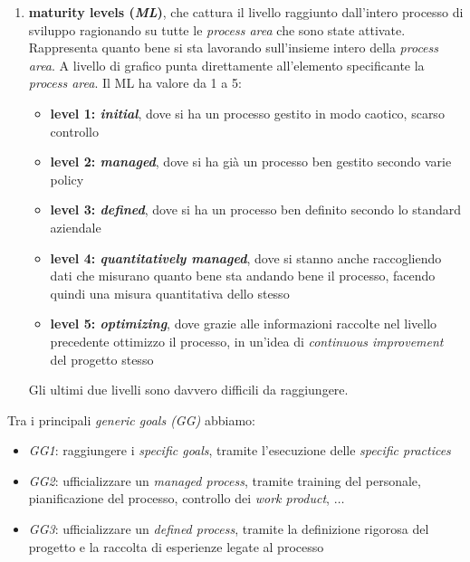\begin{enumerate}
    \item \textbf{maturity levels (\textit{ML})}, che cattura il livello raggiunto dall'intero processo di sviluppo ragionando su tutte le \textit{process area} che sono state attivate. Rappresenta quanto bene si sta lavorando sull'insieme intero della \textit{process area}. 
    A livello di grafico punta direttamente all'elemento specificante la \textit{process area}. Il ML ha valore da 1 a 5: 
        \begin{itemize} 
            \item \textbf{level 1: \textit{initial}}, dove si ha un processo gestito in modo caotico, scarso controllo
            \item \textbf{level 2: \textit{managed}}, dove si ha già un processo ben gestito secondo varie policy 
            \item \textbf{level 3: \textit{defined}}, dove si ha un processo ben definito secondo lo standard aziendale 
            \item \textbf{level 4: \textit{quantitatively managed}}, dove si stanno anche raccogliendo dati che misurano quanto bene sta andando bene il processo, facendo quindi una misura quantitativa dello stesso 
            \item \textbf{level 5: \textit{optimizing}}, dove grazie alle informazioni raccolte nel livello precedente ottimizzo il processo, in un'idea di \textit{continuous improvement} del progetto stesso 
        \end{itemize} 
    Gli ultimi due livelli sono davvero difficili da raggiungere.
\end{enumerate}

Tra i principali \textit{generic goals (GG)} abbiamo: 
\begin{itemize} 
    \item \textit{GG1}: raggiungere i \textit{specific goals}, tramite l'esecuzione delle \textit{specific practices} 
    \item \textit{GG2}: ufficializzare un \textit{managed process}, tramite training del personale, pianificazione del processo, controllo dei \textit{work product}, $\dots$ 
    \item \textit{GG3}:  ufficializzare un \textit{defined process}, tramite la definizione rigorosa del progetto e la raccolta di esperienze legate al processo 
\end{itemize}